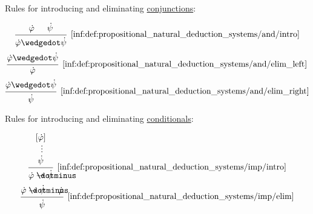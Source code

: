 \begin{definition}
\begin{thmenum}
     Rules for introducing and eliminating \hyperref[def:propositional_alphabet/connectives/conjunction]{conjunctions}:
    \begin{ThreeColumns}
      \begin{equation*}\taglabel[\( \wedge^+ \)]{inf:def:propositional_natural_deduction_systems/and/intro}
        \begin{prooftree}
          \hypo{ \syn\varphi }
          \hypo{ \syn\psi }
          \infer2[\ref{inf:def:propositional_natural_deduction_systems/and/intro}]{ \syn\varphi \synwedge \syn\psi }
        \end{prooftree}
      \end{equation*}
    \BeginSecondColumn
      \begin{equation*}\taglabel[\( \wedge^{-_L} \)]{inf:def:propositional_natural_deduction_systems/and/elim_left}
        \begin{prooftree}
          \hypo{ \syn\varphi \synwedge \syn\psi }
          \infer1[\ref{inf:def:propositional_natural_deduction_systems/and/elim_left}]{ \syn\varphi }
        \end{prooftree}
      \end{equation*}
    \BeginThirdColumn
      \begin{equation*}\taglabel[\( \wedge^{-_R} \)]{inf:def:propositional_natural_deduction_systems/and/elim_right}
        \begin{prooftree}
          \hypo{ \syn\varphi \synwedge \syn\psi }
          \infer1[\ref{inf:def:propositional_natural_deduction_systems/and/elim_right}]{ \syn\psi }
        \end{prooftree}
      \end{equation*}
    \end{ThreeColumns}

     Rules for introducing and eliminating \hyperref[def:propositional_alphabet/connectives/conditional]{conditionals}:
    \begin{TwoColumns}
      \begin{equation*}\taglabel[\( \rightarrow^+ \)]{inf:def:propositional_natural_deduction_systems/imp/intro}
        \begin{prooftree}
          \hypo{ [\syn\varphi] }
          \ellipsis {} { \syn\psi }
          \infer1[\ref{inf:def:propositional_natural_deduction_systems/imp/intro}]{ \syn\varphi \synimplies \syn\psi }
        \end{prooftree}
      \end{equation*}
    \BeginSecondColumn
      \begin{equation*}\taglabel[\( \rightarrow^- \)]{inf:def:propositional_natural_deduction_systems/imp/elim}
        \begin{prooftree}
          \hypo{ \syn\varphi \synimplies \syn\psi }
          \hypo{ \syn\varphi }
          \infer2[\ref{inf:def:propositional_natural_deduction_systems/imp/elim}]{ \syn\psi }
        \end{prooftree}
      \end{equation*}
    \end{TwoColumns}


\end{thmenum}
\end{definition}
